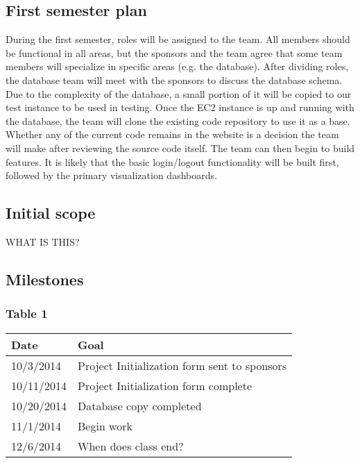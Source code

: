 \documentclass[12pt]{article}
\begin{document}
\begin{spacing}{1.5}
\section{First semester plan}
During the first semester, roles will be assigned to the team. All members should be functional in all areas, but the sponsors and the team agree that some team members will specialize in specific areas (e.g. the database). After dividing roles, the database team will meet with the sponsors to discuss the database schema. Due to the complexity of the database, a small portion of it will be copied to our test instance to be used in testing.
\newline \newline
Once the EC2 instance is up and running with the database, the team will clone the existing code repository to use it as a base. Whether any of the current code remains in the website is a decision the team will make after reviewing the source code itself. The team can then begin to build features. It is likely that the basic login/logout functionality will be built first, followed by the primary visualization dashboards.

\subsection{Initial scope}
WHAT IS THIS?

\subsection{Milestones}
\subsubsection{Table 1}
\begin{tabular}{l | l}
Date			&	Goal \\
\hline
10/3/2014		&	Project Initialization form sent to sponsors \\
\hline
10/11/2014		&	Project Initialization form complete \\
\hline
10/20/2014		&	Database copy completed \\
\hline
11/1/2014		&	Begin work \\
\hline
12/6/2014		&	When does class end? \\
\end{tabular}

\end{spacing}
\end{document}
